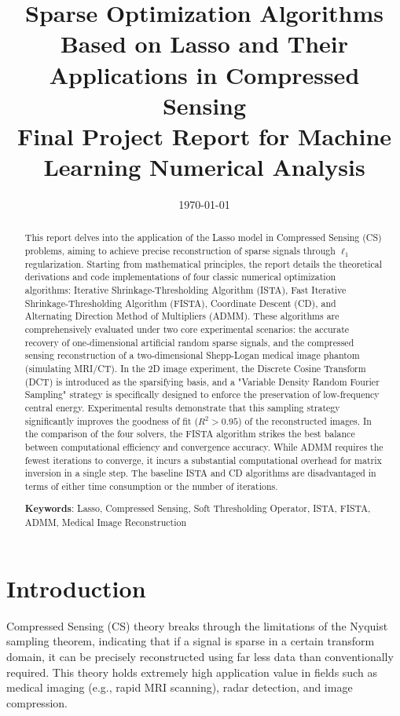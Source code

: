 \documentclass[12pt, a4paper]{article}
\title{\textbf{Sparse Optimization Algorithms Based on Lasso and Their Applications in Compressed Sensing}\\ 
\large Final Project Report for Machine Learning Numerical Analysis}
\author{}
\date{\today}
\begin{document}
\maketitle

\begin{abstract}
This report delves into the application of the Lasso model in Compressed Sensing (CS) problems, aiming to achieve precise reconstruction of sparse signals through $\ell_1$ regularization. Starting from mathematical principles, the report details the theoretical derivations and code implementations of four classic numerical optimization algorithms: Iterative Shrinkage-Thresholding Algorithm (ISTA), Fast Iterative Shrinkage-Thresholding Algorithm (FISTA), Coordinate Descent (CD), and Alternating Direction Method of Multipliers (ADMM). These algorithms are comprehensively evaluated under two core experimental scenarios: the accurate recovery of one-dimensional artificial random sparse signals, and the compressed sensing reconstruction of a two-dimensional Shepp-Logan medical image phantom (simulating MRI/CT). In the 2D image experiment, the Discrete Cosine Transform (DCT) is introduced as the sparsifying basis, and a "Variable Density Random Fourier Sampling" strategy is specifically designed to enforce the preservation of low-frequency central energy. Experimental results demonstrate that this sampling strategy significantly improves the goodness of fit ($R^2 > 0.95$) of the reconstructed images. In the comparison of the four solvers, the FISTA algorithm strikes the best balance between computational efficiency and convergence accuracy. While ADMM requires the fewest iterations to converge, it incurs a substantial computational overhead for matrix inversion in a single step. The baseline ISTA and CD algorithms are disadvantaged in terms of either time consumption or the number of iterations.

\textbf{Keywords}: Lasso, Compressed Sensing, Soft Thresholding Operator, ISTA, FISTA, ADMM, Medical Image Reconstruction
\end{abstract}

\newpage

\section{Introduction}
Compressed Sensing (CS) theory breaks through the limitations of the Nyquist sampling theorem, indicating that if a signal is sparse in a certain transform domain, it can be precisely reconstructed using far less data than conventionally required. This theory holds extremely high application value in fields such as medical imaging (e.g., rapid MRI scanning), radar detection, and image compression.
\end{document}
